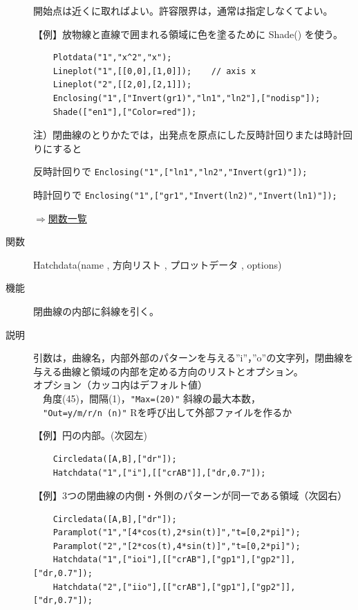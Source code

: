 \documentclass[papersize,a4paper,12pt,uplatex]{jsarticle}
\begin{document}
\begin{description}
開始点は近くに取ればよい。許容限界は，通常は指定しなくてよい。

\vspace{\baselineskip}
【例】放物線と直線で囲まれる領域に色を塗るために Shade() を使う。
\begin{verbatim}
    Plotdata("1","x^2","x");
    Lineplot("1",[[0,0],[1,0]]);    // axis x
    Lineplot("2",[[2,0],[2,1]]);
    Enclosing("1",["Invert(gr1)","ln1","ln2"],["nodisp"]);
    Shade(["en1"],["Color=red"]);
\end{verbatim}
\vspace{\baselineskip}
 \begin{center}  \end{center}

\vspace{\baselineskip}
注）閉曲線のとりかたでは，出発点を原点にした反時計回りまたは時計回りにすると

    反時計回りで  \verb|Enclosing("1",["ln1","ln2","Invert(gr1)"]);|

    時計回りで    \verb|Enclosing("1",["gr1","Invert(ln2)","Invert(ln1)"]);|

\begin{flushright}  \hyperlink{functionlist}{$\Rightarrow$関数一覧}\end{flushright}

\vspace{\baselineskip}
\hypertarget{hatchdata}{}
\item[関数]  Hatchdata(name , 方向リスト , プロットデータ , options)
\item[機能]  閉曲線の内部に斜線を引く。
\item[説明]  引数は，曲線名，内部外部のパターンを与える''i''，''o''の文字列，閉曲線を与える曲線と領域の内部を定める方向のリストとオプション。\\
オプション（カッコ内はデフォルト値）\\
　角度(45)，間隔(1)，\verb|"Max=(20)"| 斜線の最大本数，\\
　\verb|"Out=y/m/r/n (n)"| Rを呼び出して外部ファイルを作るか
  
\vspace{\baselineskip}
【例】円の内部。(次図左)
\begin{verbatim}
    Circledata([A,B],["dr"]);
    Hatchdata("1",["i"],[["crAB"]],["dr,0.7"]);
\end{verbatim}

【例】3つの閉曲線の内側・外側のパターンが同一である領域（次図右）
\begin{verbatim}
    Circledata([A,B],["dr"]);
    Paramplot("1","[4*cos(t),2*sin(t)]","t=[0,2*pi]");
    Paramplot("2","[2*cos(t),4*sin(t)]","t=[0,2*pi]");
    Hatchdata("1",["ioi"],[["crAB"],["gp1"],["gp2"]],["dr,0.7"]);
    Hatchdata("2",["iio"],[["crAB"],["gp1"],["gp2"]],["dr,0.7"]);
\end{verbatim}
\vspace{\baselineskip}
\hspace{5mm}  \hspace{5mm}    


\end{description}
\end{document}
